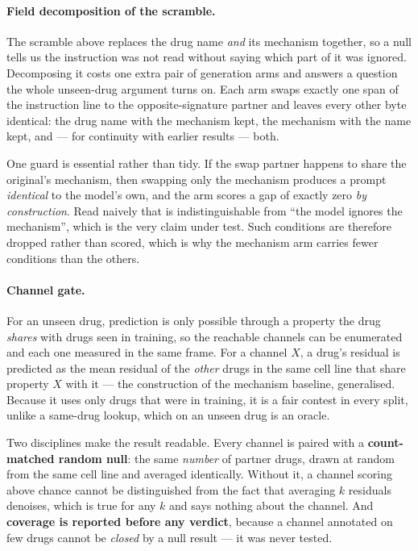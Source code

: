 

\paragraph{Field decomposition of the scramble.} The scramble above replaces the drug name
\emph{and} its mechanism together, so a null tells us the instruction was not read without saying
which part of it was ignored. Decomposing it costs one extra pair of generation arms and answers a
question the whole unseen-drug argument turns on. Each arm swaps exactly one span of the instruction
line to the opposite-signature partner and leaves every other byte identical: the drug name with the
mechanism kept, the mechanism with the name kept, and --- for continuity with earlier results --- both.

One guard is essential rather than tidy. If the swap partner happens to share the original's
mechanism, then swapping only the mechanism produces a prompt \emph{identical} to the model's own,
and the arm scores a gap of exactly zero \emph{by construction}. Read naively that is
indistinguishable from ``the model ignores the mechanism'', which is the very claim under test. Such
conditions are therefore dropped rather than scored, which is why the mechanism arm carries fewer
conditions than the others.

\paragraph{Channel gate.} For an unseen drug, prediction is only possible through a property the drug
\emph{shares} with drugs seen in training, so the reachable channels can be enumerated and each one
measured in the same frame. For a channel $X$, a drug's residual is predicted as the mean residual of
the \emph{other} drugs in the same cell line that share property $X$ with it --- the construction of
the mechanism baseline, generalised. Because it uses only drugs that were in training, it is a fair
contest in every split, unlike a same-drug lookup, which on an unseen drug is an oracle.

Two disciplines make the result readable. Every channel is paired with a \textbf{count-matched random
null}: the same \emph{number} of partner drugs, drawn at random from the same cell line and averaged
identically. Without it, a channel scoring above chance cannot be distinguished from the fact that
averaging $k$ residuals denoises, which is true for any $k$ and says nothing about the channel. And
\textbf{coverage is reported before any verdict}, because a channel annotated on few drugs cannot be
\emph{closed} by a null result --- it was never tested.

